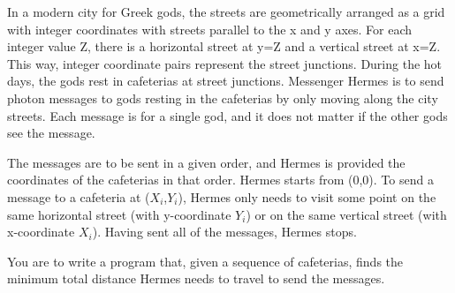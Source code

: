 In a modern city for Greek gods, the streets are geometrically arranged as a grid with integer coordinates with streets parallel to the x and y axes. For each integer value Z, there is a horizontal street at y=Z and a vertical street at x=Z. This way, integer coordinate pairs represent the street junctions. During the hot days, the gods rest in cafeterias at street junctions. Messenger Hermes is to send photon messages to gods resting in the cafeterias by only moving along the city streets. Each message is for a single god, and it does not matter if the other gods see the message. 


The messages are to be sent in a given order, and Hermes is provided the coordinates of the cafeterias in that order. Hermes starts from (0,0). To send a message to a cafeteria at ($X_i$,$Y_i$), Hermes only needs to visit some point on the same horizontal street (with y-coordinate $Y_i$) or on the same vertical street (with x-coordinate $X_i$). Having sent all of the messages, Hermes stops. 

You are to write a program that, given a sequence of cafeterias, finds the minimum total distance Hermes needs to travel to send the messages. 
